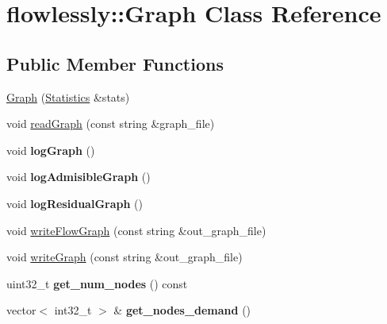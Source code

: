 \hypertarget{classflowlessly_1_1Graph}{\section{flowlessly\-:\-:\-Graph \-Class \-Reference}
\label{classflowlessly_1_1Graph}
}
\subsection*{\-Public \-Member \-Functions}
\begin{DoxyCompactItemize}
\item 
\hyperlink{classflowlessly_1_1Graph_ab8f10dc0cfb341e62b36c8933fd34206}{\-Graph} (\hyperlink{classflowlessly_1_1Statistics}{\-Statistics} \&stats)
\item 
void \hyperlink{classflowlessly_1_1Graph_a00102825c05a2f8218c702fa8d215e1f}{read\-Graph} (const string \&graph\-\_\-file)
\item 
\hypertarget{classflowlessly_1_1Graph_a7a0f23201c8a6a05dace38b98ce8c02e}{void {\bfseries log\-Graph} ()}\label{classflowlessly_1_1Graph_a7a0f23201c8a6a05dace38b98ce8c02e}

\item 
\hypertarget{classflowlessly_1_1Graph_a4c78cb6fdd88e0ac91b7d3a46ef15fba}{void {\bfseries log\-Admisible\-Graph} ()}\label{classflowlessly_1_1Graph_a4c78cb6fdd88e0ac91b7d3a46ef15fba}

\item 
\hypertarget{classflowlessly_1_1Graph_a887e77fd7799609b877b02f9c42bbd5f}{void {\bfseries log\-Residual\-Graph} ()}\label{classflowlessly_1_1Graph_a887e77fd7799609b877b02f9c42bbd5f}

\item 
void \hyperlink{classflowlessly_1_1Graph_a009b8c032eeb3c5cdd9f8985461329f1}{write\-Flow\-Graph} (const string \&out\-\_\-graph\-\_\-file)
\item 
void \hyperlink{classflowlessly_1_1Graph_aff0bd13f59bf394ddd6a8137fc1c92e0}{write\-Graph} (const string \&out\-\_\-graph\-\_\-file)
\item 
\hypertarget{classflowlessly_1_1Graph_abd66fe2179d2745978276b53dcf8b2fd}{uint32\-\_\-t {\bfseries get\-\_\-num\-\_\-nodes} () const }\label{classflowlessly_1_1Graph_abd66fe2179d2745978276b53dcf8b2fd}

\item 
\hypertarget{classflowlessly_1_1Graph_aa673b4373b56da6e41fbe9b054af2ec5}{vector$<$ int32\-\_\-t $>$ \& {\bfseries get\-\_\-nodes\-\_\-demand} ()}\label{classflowlessly_1_1Graph_aa673b4373b56da6e41fbe9b054af2ec5}


\end{DoxyCompactItemize}
